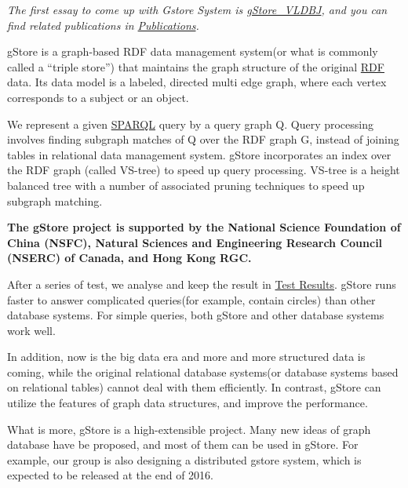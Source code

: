 \documentclass[titlepage, a4paper, 12pt]{article}
\begin{document}
\textit{The first essay to come up with Gstore System is
\href{run:../pdf/gStoreVLDBJ.pdf}{gStore\_VLDBJ}, and you can find related publications in
\hyperref[chapter09]{Publications}.}


gStore is a graph-based RDF data management system(or what is commonly called a ``triple store'') that maintains the graph structure of the original \href{http://www.w3.org/TR/rdf11-concepts/}{RDF} data. Its data model is a labeled, directed multi edge graph, where each vertex corresponds to a subject or an object.

We represent a given \href{http://www.w3.org/TR/sparql11-overview/}{SPARQL} query by a query graph Q. Query processing involves finding subgraph matches of Q over the RDF graph G, instead of joining tables in relational data management system. gStore incorporates an index over the RDF graph (called VS-tree) to speed up query processing. VS-tree is a height balanced tree with a number of associated pruning techniques to speed up subgraph matching.

\textbf{The gStore project is supported by the National Science Foundation of China (NSFC), Natural Sciences and Engineering Research Council (NSERC) of Canada, and Hong Kong RGC.}


After a series of test, we analyse and keep the result in \hyperref[chapter15]{Test Results}. gStore runs faster to answer complicated queries(for example, contain circles) than other database systems. For simple queries, both gStore and other database systems work
well.

In addition, now is the big data era and more and more structured data is coming, while the original relational database systems(or database systems based on relational tables) cannot deal with them efficiently.  In contrast, gStore can utilize the features of graph data structures, and improve the performance.

What is more, gStore is a high-extensible project. Many new ideas of graph database have be proposed, and most of them can be used in gStore.  For example, our group is also designing a distributed gstore system, which is expected to be released at the end of 2016.
\end{document}
